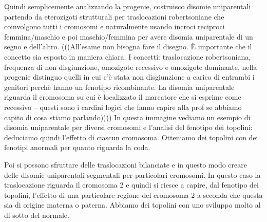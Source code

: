 \documentclass[11pt]{book}
\begin{document}
Quindi semplicemente analizzando la progenie, costruisco disomie uniparentali partendo da eterozigoti strutturali per traslocazioni robertsoniane che coinvolgono tutti i cromosomi e naturalmente usando incroci reciproci femmina/maschio e poi maschio/femmina per avere disomia uniparentale di un segno e dell’altro.
(((All’esame non bisogna fare il disegno. È importante che il concetto sia esposto in maniera chiara. I concetti: traslocazione robertsoniana, frequenza di non disgiunzione, omozigote recessivo e omozigote dominante, nella progenie distinguo quelli in cui c’è stata non disgiunzione a carico di entrambi i genitori perchè hanno un fenotipo ricombinante. La disomia uniparentale riguarda il cromosoma su cui è localizzato il marcatore che si esprime come recessivo -- questi sono i cardini logici che fanno capire alla prof se abbiamo capito di cosa stiamo parlando))))
In questa immagine vediamo un esempio di disomia uniparentale per diversi cromosomi e l’analisi del fenotipo dei topolini: deduciamo quindi l’effetto di ciascun cromosoma. 
Otteniamo dei topolini con dei fenotipi anormali per quanto riguarda la coda.




Poi si possono sfruttare delle traslocazioni bilanciate e in questo modo creare delle disomie uniparentali segmentali per particolari cromosomi.
In questo caso la traslocazione riguarda il cromosoma 2 e quindi si riesce a capire, dal fenotipo dei topolini, l’effetto di una particolare regione del cromosoma 2 a seconda che questa sia di origine materna o paterna. 
Abbiamo dei topolini con uno sviluppo molto al di sotto del normale.
\end{document}
